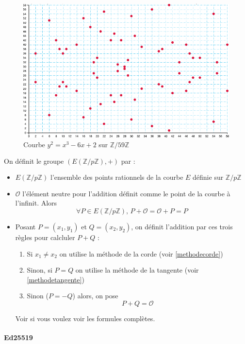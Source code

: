 \documentclass[a4paper, 12pt]{article}
\begin{document}
\begin{figure}[h]
	\centering
	\includegraphics[width=.8\textwidth]{img/courbezpz.png}
	\caption{Courbe $y^2 = x^3 -6x + 2$ sur $ \mathbb{Z}/59\mathbb{Z}$}
	\label{courbezpz}
\end{figure}



\noindent On définit le groupe $\left(E\left( \mathbb{Z}/p\mathbb{Z} \right), +\right)$ par :
\begin{itemize}
	\item $E\left( \mathbb{Z}/p\mathbb{Z} \right)$ l'ensemble des points rationnels de la courbe $E$ définie sur $\mathbb{Z}/p\mathbb{Z}$
	\item $\mathcal{O}$ l'élément neutre pour l'addition définit comme le point de la courbe à l'infinit. Alors
		$$
		\forall P \in E\left( \mathbb{Z}/p\mathbb{Z} \right), \, P + \mathcal{O} = \mathcal{O}+P=P
		$$
	\item Posant $P = (x_1, y_1)$ et $Q = (x_2, y_2)$, on définit l'addition par ces trois règles pour calcluler $P+Q$ :
	\begin{enumerate}
		\item Si $x_1 \neq x_2$ on utilise la méthode de la corde (voir \ref{methodecorde})
		\item Sinon, si $P = Q$ on utilise la méthode de la tangente (voir \ref{methodetangente})
		\item Sinon ($P = -Q$) alors, on pose 
		$$
		P+Q = \mathcal{O}
		$$
	\end{enumerate}
	Voir \cite{courslong} si vous voulez voir les formules complètes.
\end{itemize}


\paragraph{Ed25519}\label{courbeed}
\end{document}
